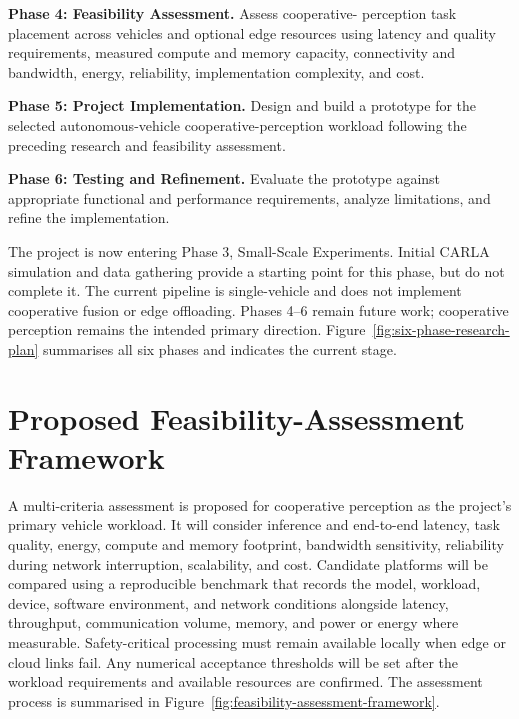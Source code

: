 \documentclass[12pt,a4paper,oneside]{report}
\begin{document}
\par\medskip
\noindent\textbf{Phase 4: Feasibility Assessment.} Assess cooperative-
perception task placement across vehicles and optional edge resources using
latency and quality requirements, measured compute and memory capacity,
connectivity and bandwidth, energy, reliability, implementation complexity,
and cost.

\par\medskip
\noindent\textbf{Phase 5: Project Implementation.} Design and build a
prototype for the selected autonomous-vehicle cooperative-perception
workload following the
preceding research and feasibility assessment.

\par\medskip
\noindent\textbf{Phase 6: Testing and Refinement.} Evaluate the prototype
against appropriate functional and performance requirements, analyze
limitations, and refine the implementation.

The project is now entering Phase 3, Small-Scale Experiments. Initial CARLA
simulation and data gathering provide a starting point for this phase, but
do not complete it. The current pipeline is single-vehicle and does not
implement cooperative fusion or edge offloading. Phases 4--6 remain future
work; cooperative perception remains the intended primary direction.
Figure~\ref{fig:six-phase-research-plan} summarises all six phases and
indicates the current stage.

\section{Proposed Feasibility-Assessment Framework}

A multi-criteria assessment is proposed for cooperative perception as the
project's primary vehicle workload. It will consider inference and end-to-end
latency, task quality, energy, compute and memory footprint, bandwidth
sensitivity, reliability during network interruption, scalability, and
cost. Candidate platforms will be compared using a reproducible benchmark
that records the model, workload, device, software environment, and network
conditions alongside latency, throughput, communication volume, memory,
and power or energy where measurable. Safety-critical processing must
remain available locally when edge or cloud links fail. Any numerical
acceptance thresholds will be set after the workload requirements and
available resources are confirmed. The assessment process is summarised in
Figure~\ref{fig:feasibility-assessment-framework}.
\end{document}
